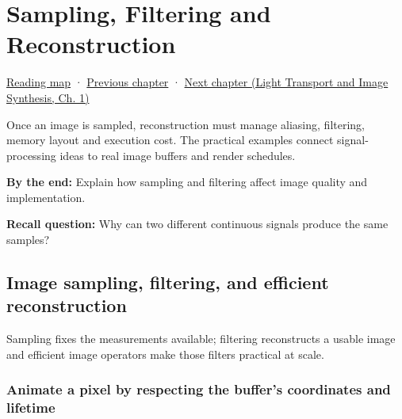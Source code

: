 \chapter{Sampling, Filtering and Reconstruction}\label{03-visual-computing-i-ch004-sampling-filtering-and-reconstruction}\hypertarget{03-visual-computing-i-ch004}{}\label{stagechapter:03-visual-computing-i-ch004}

\hypertarget{03-visual-computing-i-ch004-sampling-filtering-and-reconstruction}{}

\hyperref[volume-reading-map]{Reading map} · \hyperref[03-visual-computing-i-ch003-lens-optics-and-image-formation]{Previous chapter} · \href{../04-Light-Transport-and-Image-Synthesis/main.pdf\#nameddest=03-visual-computing-i-ch005-reflectance-materials-and-light-transport}{Next chapter (Light Transport and Image Synthesis, Ch. 1)}

Once an image is sampled, reconstruction must manage aliasing, filtering, memory layout and execution cost. The practical examples connect signal-processing ideas to real image buffers and render schedules.

\textbf{By the end:} Explain how sampling and filtering affect image quality and implementation.

\textbf{Recall question:} Why can two different continuous signals produce the same samples?

\section{Image sampling, filtering, and efficient reconstruction}\label{03-visual-computing-i-ch004-image-sampling-filtering-and-efficient-reconstruction}

\hypertarget{03-visual-computing-i-ch004-image-sampling-filtering-and-efficient-reconstruction}{}

Sampling fixes the measurements available; filtering reconstructs a usable image and efficient image operators make those filters practical at scale.

\subsection{Animate a pixel by respecting the buffer's coordinates and lifetime}\label{03-visual-computing-i-ch004-animate-a-pixel-by-respecting-the-buffers-coordinates-and-lifetime}

\hypertarget{03-visual-computing-i-ch004-animate-a-pixel-by-respecting-the-buffers-coordinates-and-lifetime}{}


